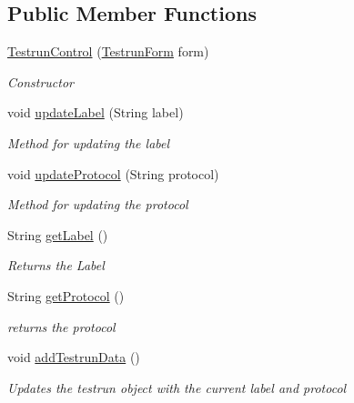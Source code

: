 \subsection*{Public Member Functions}
\begin{DoxyCompactItemize}
\item 
\hyperlink{class_web_analyzer_1_1_u_i_1_1_interaction_objects_1_1_testrun_control_a4c7cc1fb505c57b84d0247abb85eb424}{Testrun\+Control} (\hyperlink{class_web_analyzer_1_1_u_i_1_1_testrun_form}{Testrun\+Form} form)
\begin{DoxyCompactList}\small\item\em Constructor \end{DoxyCompactList}\item 
void \hyperlink{class_web_analyzer_1_1_u_i_1_1_interaction_objects_1_1_testrun_control_afe75adb92ec988b41703ce1f4756f0cb}{update\+Label} (String label)
\begin{DoxyCompactList}\small\item\em Method for updating the label \end{DoxyCompactList}\item 
void \hyperlink{class_web_analyzer_1_1_u_i_1_1_interaction_objects_1_1_testrun_control_a4d48e389fa01651d00601014fd26abc2}{update\+Protocol} (String protocol)
\begin{DoxyCompactList}\small\item\em Method for updating the protocol \end{DoxyCompactList}\item 
String \hyperlink{class_web_analyzer_1_1_u_i_1_1_interaction_objects_1_1_testrun_control_ab200223a2ab56282c3312d2d4019b689}{get\+Label} ()
\begin{DoxyCompactList}\small\item\em Returns the Label \end{DoxyCompactList}\item 
String \hyperlink{class_web_analyzer_1_1_u_i_1_1_interaction_objects_1_1_testrun_control_a8a702b4953fe5cb8d9de125a1004f003}{get\+Protocol} ()
\begin{DoxyCompactList}\small\item\em returns the protocol \end{DoxyCompactList}\item 
void \hyperlink{class_web_analyzer_1_1_u_i_1_1_interaction_objects_1_1_testrun_control_a2ca0a1cab51ceaef19727b11a22c2394}{add\+Testrun\+Data} ()
\begin{DoxyCompactList}\small\item\em Updates the testrun object with the current label and protocol \end{DoxyCompactList}\item 

\end{DoxyCompactItemize}
